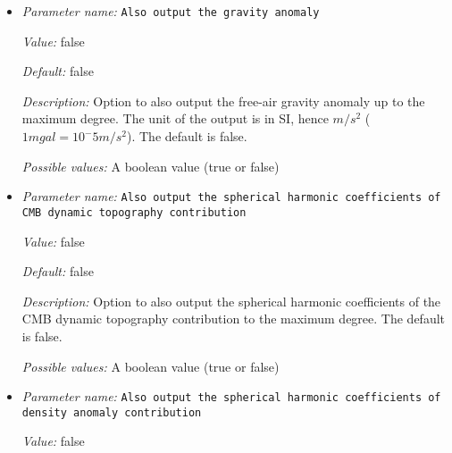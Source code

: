 \begin{itemize}
\item {\it Parameter name:} {\tt Also output the gravity anomaly}
\label{parameters:Postprocess/Geoid/Also output the gravity anomaly}
\label{parameters:Postprocess/Geoid/Also_20output_20the_20gravity_20anomaly}


{\it Value:} false


{\it Default:} false


{\it Description:} Option to also output the free-air gravity anomaly up to the maximum degree. The unit of the output is in SI, hence $m/s^2$ ($1mgal = 10^-5 m/s^2$). The default is false. 


{\it Possible values:} A boolean value (true or false)
\item {\it Parameter name:} {\tt Also output the spherical harmonic coefficients of CMB dynamic topography contribution}
\label{parameters:Postprocess/Geoid/Also output the spherical harmonic coefficients of CMB dynamic topography contribution}
\label{parameters:Postprocess/Geoid/Also_20output_20the_20spherical_20harmonic_20coefficients_20of_20CMB_20dynamic_20topography_20contribution}


{\it Value:} false


{\it Default:} false


{\it Description:} Option to also output the spherical harmonic coefficients of the CMB dynamic topography contribution to the maximum degree. The default is false. 


{\it Possible values:} A boolean value (true or false)
\item {\it Parameter name:} {\tt Also output the spherical harmonic coefficients of density anomaly contribution}
\label{parameters:Postprocess/Geoid/Also output the spherical harmonic coefficients of density anomaly contribution}
\label{parameters:Postprocess/Geoid/Also_20output_20the_20spherical_20harmonic_20coefficients_20of_20density_20anomaly_20contribution}


{\it Value:} false



\end{itemize}
